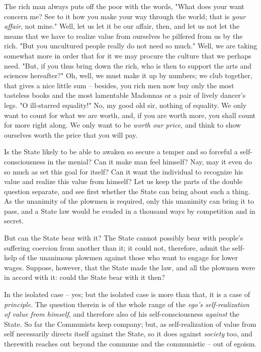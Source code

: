\documentclass[a4paper]{book}
\begin{document}
The rich man always puts off the poor with the words, "{}What does your want 
concern me? See to it how you make your way through the world; that is 
\textit{your affair}, not mine."{} Well, let us let it be our affair, then, 
and let us not let the means that we have to realize value from ourselves be 
pilfered from us by the rich. "{}But you uncultured people really do not need 
so much."{} Well, we are taking somewhat more in order that for it we may 
procure the culture that we perhaps need. "{}But, if you thus bring down the 
rich, who is then to support the arts and sciences hereafter?"{} Oh, well, we 
must make it up by numbers; we club together, that gives a nice little sum -- 
besides, you rich men now buy only the most tasteless books and the most 
lamentable Madonnas or a pair of lively dancer's legs. "{}O ill-starred 
equality!"{} No, my good old sir, nothing of equality. We only want to count 
for what we are worth, and, if you are worth more, you shall count for more 
right along. We only want to be \textit{worth our price}, and think to show 
ourselves worth the price that you will pay.

Is the State likely to be able to awaken so secure a temper and so forceful a 
self-consciousness in the menial? Can it make man feel himself? Nay, may it 
even do so much as set this goal for itself? Can it want the individual to 
recognize his value and realize this value from himself? Let us keep the parts 
of the double question separate, and see first whether the State can bring 
about such a thing. As the unanimity of the plowmen is required, only this 
unanimity can bring it to pass, and a State law would be evaded in a thousand 
ways by competition and in secret.

But can the State bear with it? The State cannot possibly bear with people's 
suffering coercion from another than it; it could not, therefore, admit the 
self-help of the unanimous plowmen against those who want to engage for lower 
wages. Suppose, however, that the State made the law, and all the plowmen were 
in accord with it: could the State bear with it then?

In the isolated case -- yes; but the isolated case is more than that, it is a 
case of \textit{principle}. The question therein is of the whole range of the 
\textit{ego's self-realization of value from himself}, and therefore also of 
his self-consciousness \textit{against} the State. So far the Communists keep 
company; but, as self-realization of value from self necessarily directs 
itself against the State, so it does against \textit{society} too, and 
therewith reaches out beyond the commune and the communistic -- out of egoism.
\end{document}

